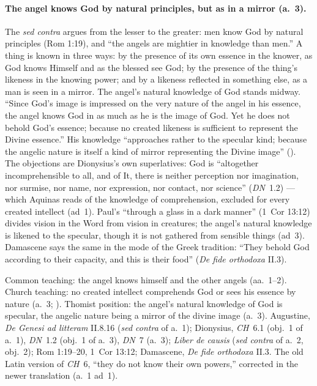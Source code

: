 \paragraph{The angel knows God by natural principles, but as in a mirror
(a.~3).} The \emph{sed contra} argues from the lesser to the greater: men
know God by natural principles (Rom 1:19), and ``the angels are mightier
in knowledge than men.'' A thing is known in three ways: by the presence
of its own essence in the knower, as God knows Himself and as the blessed
see God; by the presence of the thing's likeness in the knowing power; and
by a likeness reflected in something else, as a man is seen in a mirror.
The angel's natural knowledge of God stands midway. ``Since God's image is
impressed on the very nature of the angel in his essence, the angel knows
God in as much as he is the image of God. Yet he does not behold God's
essence; because no created likeness is sufficient to represent the Divine
essence.'' His knowledge ``approaches rather to the specular kind; because
the angelic nature is itself a kind of mirror representing the Divine
image'' (). The objections are Dionysius's own
superlatives: God is ``altogether incomprehensible to all, and of It,
there is neither perception nor imagination, nor surmise, nor name, nor
expression, nor contact, nor science'' (\emph{DN}~1.2) --- which Aquinas
reads of the knowledge of comprehension, excluded for every created
intellect (ad~1). Paul's ``through a glass in a dark manner'' (1~Cor
13:12) divides vision in the Word from vision in creatures; the angel's
natural knowledge is likened to the specular, though it is not gathered
from sensible things (ad~3). Damascene says the same in the mode of the
Greek tradition: ``They behold God according to their capacity, and this
is their food'' (\emph{De fide orthodoxa} II.3).

 {Common teaching: the angel knows himself and the other angels
 (aa.~1--2). Church teaching: no created intellect comprehends God or
 sees his essence by nature (a.~3; ). Thomist position: the
 angel's natural knowledge of God is specular, the angelic nature being a
 mirror of the divine image (a.~3).}
 {Augustine, \emph{De Genesi ad litteram} II.8.16 (\emph{sed contra} of
 a.~1); Dionysius, \emph{CH}~6.1 (obj.~1 of a.~1), \emph{DN}~1.2 (obj.~1
 of a.~3), \emph{DN}~7 (a.~3); \emph{Liber de causis} (\emph{sed contra}
 of a.~2, obj.~2); Rom 1:19--20, 1~Cor 13:12; Damascene, \emph{De fide
 orthodoxa} II.3.}
 {The old Latin version of \emph{CH}~6, ``they do not know their own
 powers,'' corrected in the newer translation (a.~1 ad~1).}

